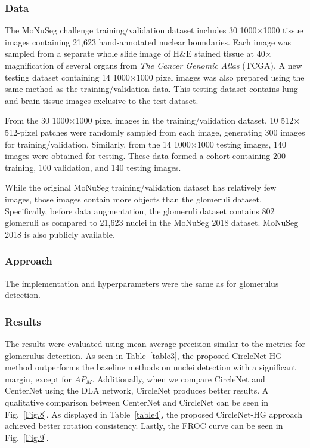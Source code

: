 \documentclass[journal]{IEEEtran}
\newcommand{\Fig}{Fig.}
\newcommand{\Tab}{Table}
\begin{document}
\subsubsection{Data}
The MoNuSeg challenge training/validation dataset includes 30 1000$\times$1000 tissue images containing 21,623 hand-annotated nuclear boundaries. Each image was sampled from a separate whole slide image of H\&E stained tissue at 40$\times$ magnification of several organs from \emph{The Cancer Genomic Atlas} (TCGA). A new testing dataset containing 14 1000$\times$1000 pixel images was also prepared using the same method as the training/validation data. This testing dataset contains lung and brain tissue images exclusive to the test dataset. 

From the 30 1000$\times$1000 pixel images in the training/validation dataset, 10 512$\times$ 512-pixel patches were randomly sampled from each image, generating 300 images for training/validation. Similarly, from the 14 1000$\times$1000 testing images, 140 images were obtained for testing. These data formed a cohort containing 200 training, 100 validation, and 140 testing images. 

While the original MoNuSeg training/validation dataset has relatively few images, those images contain more objects than the glomeruli dataset. Specifically, before data augmentation, the glomeruli dataset contains 802 glomeruli as compared to 21,623 nuclei in the MoNuSeg 2018 dataset. MoNuSeg 2018 is also publicly available.
\subsubsection{Approach}
The implementation and hyperparameters were the same as for glomerulus detection. 

\subsubsection{Results}
The results were evaluated using mean average precision similar to the metrics for glomerulus detection. As seen in \Tab~\ref{table3}, the proposed CircleNet-HG method outperforms the baseline methods on nuclei detection with a significant margin, except for $AP_M$. Additionally, when we compare CircleNet and CenterNet using the DLA network, CircleNet produces better results. A qualitative comparison between CenterNet and CircleNet can be seen in \Fig~\ref{Fig.8}. As displayed in \Tab~\ref{table4}, the proposed CircleNet-HG approach achieved better rotation consistency. Lastly, the FROC curve can be seen in \Fig~\ref{Fig.9}.
\end{document}

